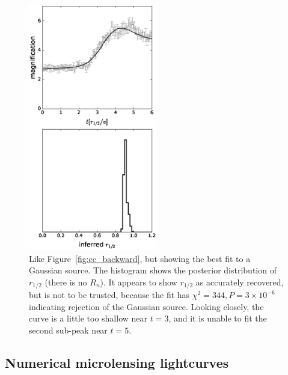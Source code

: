\documentclass[usenatbib]{mn2e}
\begin{document}
\begin{figure}
\centering
  \includegraphics[width=0.5\textwidth]{figures/gc_forward.eps}
\caption{\label{fig:gc_forward} Like Figure~\ref{fig:cc_backward}, but
  showing the best fit to a Gaussian source.  The histogram shows the
  posterior distribution of $r_{1/2}$ (there is no $R_n$).  It appears
  to show $r_{1/2}$ as accurately recovered, but is not to be trusted,
  because the fit has $\chi^2=344, P=3\times10^{-6}$ indicating
  rejection of the Gaussian source.  Looking closely, the curve is a
  little too shallow near $t=3$, and it is unable to fit the second
  sub-peak near $t=5$.}
\end{figure}

\subsection{Numerical microlensing lightcurves}
\end{document}
